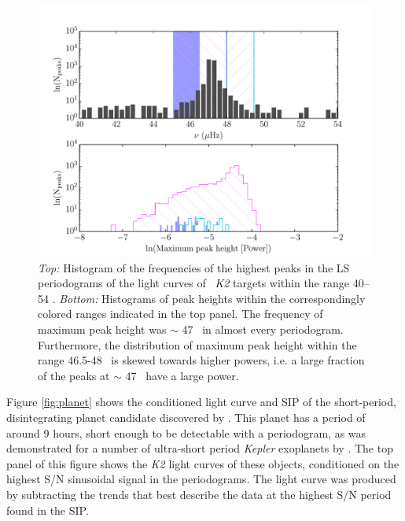 \begin{figure}[h]
\begin{center}
\includegraphics[width=6in, clip=true]{figures/vbg_hist.pdf}
\caption[Thruster firing signals in \ktwo\ light curves.]
{{\it Top:} Histogram of the frequencies of the highest peaks in the
	LS periodograms of the \citet{Vanderburg2014} light curves of \nGO\
	{\it K2} targets within the range 40--54 \uHz.
	{\it Bottom:} Histograms of peak heights within the correspondingly
	colored ranges indicated in the top panel.
	The frequency of maximum peak height was $\sim$ 47 \uHz\ in almost
	every periodogram.
	Furthermore, the distribution of maximum peak height within the range
	46.5-48 \uHz\ is skewed towards higher powers, i.e. a large fraction of
	the peaks at $\sim$ 47 \uHz\ have a large power.
}
\label{fig:vbg_hist}
\end{center}
\end{figure}

Figure \ref{fig:planet} shows the conditioned light curve and SIP of the
short-period, disintegrating planet candidate discovered by
\citet{Sanchis-Ojeda2015}.
This planet has a period of around 9 hours, short enough to be detectable
with a periodogram, as was demonstrated for a number of ultra-short
period {\it Kepler} exoplanets by \citet{Sanchis-Ojeda2014}.
The top panel of this figure shows the {\it K2} light curves of these
objects, conditioned on the highest S/N sinusoidal signal in the
periodograms.
The light curve was produced by subtracting the trends that best describe
the data at the highest S/N period found in the SIP.

